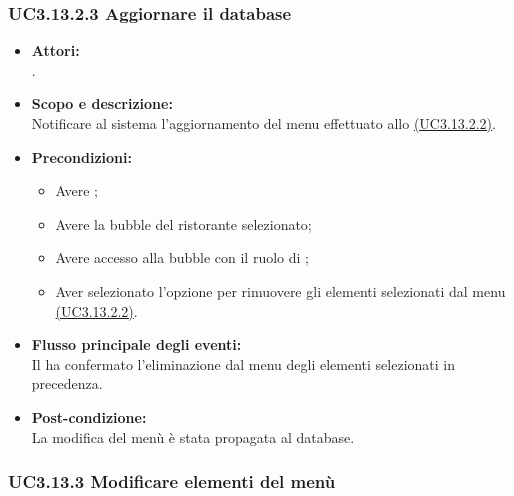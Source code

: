 \subsubsection{UC3.13.2.3 Aggiornare il database} \label{UC3.13.2.3}

\begin{itemize}
	\item \textbf{Attori:}
	\\.
	\item \textbf{Scopo e descrizione:} 
	\\Notificare al sistema l'aggiornamento del menu effettuato allo \hyperref[UC3.13.2.2]{(UC3.13.2.2)}.
	\item \textbf{Precondizioni:}
	\begin{itemize}
		\item Avere ;
		\item Avere la bubble del ristorante selezionato;
		\item Avere accesso alla bubble con il ruolo di ;
		\item Aver selezionato l'opzione per rimuovere gli elementi selezionati dal menu \hyperref[UC3.13.2.2]{(UC3.13.2.2)}.
	\end{itemize}
	\item \textbf{Flusso principale degli eventi:}
	\\Il {} ha confermato l'eliminazione dal menu degli elementi selezionati in precedenza.
	\item \textbf{Post-condizione:}
	\\La modifica del menù è stata propagata al database.
\end{itemize}

\subsubsection{UC3.13.3 Modificare elementi del menù} \label{UC3.13.3}

